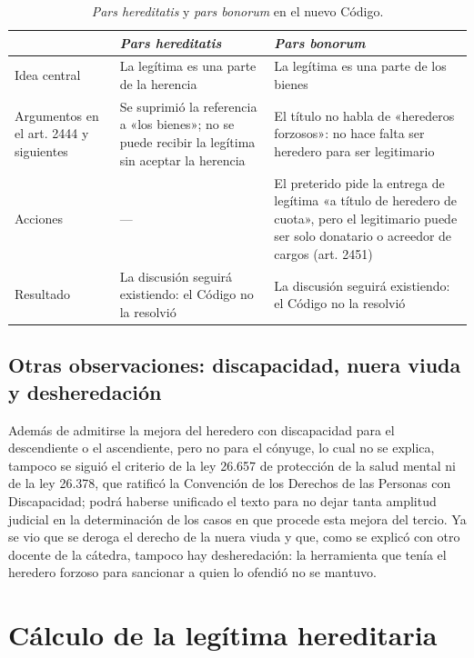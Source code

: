 \documentclass[12pt,oneside]{book}
\begin{document}
\begin{table}[H]
\centering
\small
\begin{tabularx}{\textwidth}{
    >{\raggedright\arraybackslash}p{3cm}
    >{\raggedright\arraybackslash}X
    >{\raggedright\arraybackslash}X
}
\toprule
 & \textbf{\textit{Pars hereditatis}} & \textbf{\textit{Pars bonorum}} \\
\midrule
Idea central & La legítima es una parte de la herencia & La legítima es una parte de los bienes \\
\addlinespace
Argumentos en el art. 2444 y siguientes & Se suprimió la referencia a «los bienes»; no se puede recibir la legítima sin aceptar la herencia & El título no habla de «herederos forzosos»: no hace falta ser heredero para ser legitimario \\
\addlinespace
Acciones & --- & El preterido pide la entrega de legítima «a título de heredero de cuota», pero el legitimario puede ser solo donatario o acreedor de cargos (art. 2451) \\
\addlinespace
Resultado & La discusión seguirá existiendo: el Código no la resolvió & La discusión seguirá existiendo: el Código no la resolvió \\
\bottomrule
\end{tabularx}
\caption*{\textit{Pars hereditatis} y \textit{pars bonorum} en el nuevo Código.}
\end{table}

\subsection[Otras observaciones]{Otras observaciones: discapacidad, nuera viuda y desheredación}

Además de admitirse la mejora del heredero con discapacidad para el descendiente o el ascendiente, pero no para el cónyuge, lo cual no se explica, tampoco se siguió el criterio de la ley 26.657 de protección de la salud mental ni de la ley 26.378, que ratificó la Convención de los Derechos de las Personas con Discapacidad; podrá haberse unificado el texto para no dejar tanta amplitud judicial en la determinación de los casos en que procede esta mejora del tercio. Ya se vio que se deroga el derecho de la nuera viuda y que, como se explicó con otro docente de la cátedra, tampoco hay desheredación: la herramienta que tenía el heredero forzoso para sancionar a quien lo ofendió no se mantuvo.

\section{Cálculo de la legítima hereditaria}
\end{document}
